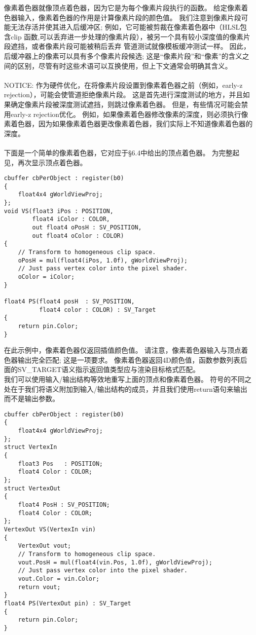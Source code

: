 \begin{flushleft}
像素着色器就像顶点着色器，因为它是为每个像素片段执行的函数。 给定像素着色器输入，像素着色器的作用是计算像素片段的颜色值。 我们注意到像素片段可能无法存活并使其进入后缓冲区; 例如，它可能被剪裁在像素着色器中（HLSL包含clip 函数,可以丢弃进一步处理的像素片段），被另一个具有较小深度值的像素片段遮挡，或者像素片段可能被稍后丢弃 管道测试就像模板缓冲测试一样。 因此，后缓冲器上的像素可以具有多个像素片段候选; 这是“像素片段”和“像素”的含义之间的区别，尽管有时这些术语可以互换使用，但上下文通常会明确其含义。\\
~\\
NOTICE: 作为硬件优化，在将像素片段设置到像素着色器之前（例如，early-z rejection），可能会使管道拒绝像素片段。 这是首先进行深度测试的地方，并且如果确定像素片段被深度测试遮挡，则跳过像素着色器。 但是，有些情况可能会禁用early-z rejection优化。 例如，如果像素着色器修改像素的深度，则必须执行像素着色器，因为如果像素着色器更改像素着色器，我们实际上不知道像素着色器的深度。\\
~\\
下面是一个简单的像素着色器，它对应于§6.4中给出的顶点着色器。 为完整起见，再次显示顶点着色器。\\
\end{flushleft}
\begin{lstlisting}
cbuffer cbPerObject : register(b0)
{
    float4x4 gWorldViewProj;
};
void VS(float3 iPos : POSITION, 
        float4 iColor : COLOR,
        out float4 oPosH : SV_POSITION,
        out float4 oColor : COLOR)
{
    // Transform to homogeneous clip space.
    oPosH = mul(float4(iPos, 1.0f), gWorldViewProj);
    // Just pass vertex color into the pixel shader.
    oColor = iColor;
}

float4 PS(float4 posH  : SV_POSITION, 
          float4 color : COLOR) : SV_Target
{
    return pin.Color;
}
\end{lstlisting}
\begin{flushleft}
在此示例中，像素着色器仅返回插值颜色值。 请注意，像素着色器输入与顶点着色器输出完全匹配; 这是一项要求。 像素着色器返回4D颜色值，函数参数列表后面的SV\_TARGET语义指示返回值类型应与渲染目标格式匹配。\\
我们可以使用输入/输出结构等效地重写上面的顶点和像素着色器。 符号的不同之处在于我们将语义附加到输入/输出结构的成员，并且我们使用return语句来输出而不是输出参数。
\end{flushleft}
\begin{lstlisting}
cbuffer cbPerObject : register(b0)
{
    float4x4 gWorldViewProj;
};
struct VertexIn
{
    float3 Pos   : POSITION;
    float4 Color : COLOR;
};
struct VertexOut
{
    float4 PosH : SV_POSITION;
    float4 Color : COLOR;
};
VertexOut VS(VertexIn vin)
{
    VertexOut vout;
    // Transform to homogeneous clip space.
    vout.PosH = mul(float4(vin.Pos, 1.0f), gWorldViewProj);
    // Just pass vertex color into the pixel shader.
    vout.Color = vin.Color;
    return vout;
}
float4 PS(VertexOut pin) : SV_Target
{
    return pin.Color;
}
\end{lstlisting}

